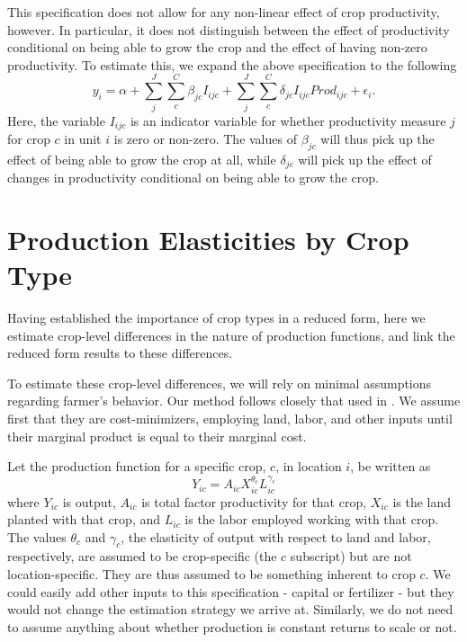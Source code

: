 \documentclass[10pt]{article}
\begin{document}
This specification does not allow for any non-linear effect of crop productivity, however. In particular, it does not distinguish between the effect of productivity conditional on being able to grow the crop and the effect of having non-zero productivity. To estimate this, we expand the above specification to the following
\begin{equation}
	y_{i} = \alpha + \sum_j^J \sum_{c}^C \beta_{jc} I_{ijc} + \sum_j^J \sum_{c}^C \delta_{jc} I_{ijc} Prod_{ijc} + \epsilon_{i}.
\end{equation}
Here, the variable $I_{ijc}$ is an indicator variable for whether productivity measure $j$ for crop $c$ in unit $i$ is zero or non-zero. The values of $\beta_{jc}$ will thus pick up the effect of being able to grow the crop at all, while $\delta_{jc}$ will pick up the effect of changes in productivity conditional on being able to grow the crop.

\section{Production Elasticities by Crop Type}
Having established the importance of crop types in a reduced form, here we estimate crop-level differences in the nature of production functions, and link the reduced form results to these differences. 

To estimate these crop-level differences, we will rely on minimal assumptions regarding farmer's behavior. Our method follows closely that used in \citet{fs2015}. We assume first that they are cost-minimizers, employing land, labor, and other inputs until their marginal product is equal to their marginal cost. 

Let the production function for a specific crop, $c$, in location $i$, be written as
\begin{equation}
	Y_{ic} = A_{ic} X_{ic}^{\theta_c} L_{ic}^{\gamma_c}
\end{equation}
where $Y_{ic}$ is output, $A_{ic}$ is total factor productivity for that crop, $X_{ic}$ is the land planted with that crop, and $L_{ic}$ is the labor employed working with that crop. The values $\theta_c$ and $\gamma_c$, the elasticity of output with respect to land and labor, respectively, are assumed to be crop-specific (the $c$ subscript) but are not location-specific. They are thus assumed to be something inherent to crop $c$. We could easily add other inputs to this specification - capital or fertilizer - but they would not change the estimation strategy we arrive at. Similarly, we do not need to assume anything about whether production is constant returns to scale or not.
\end{document}
